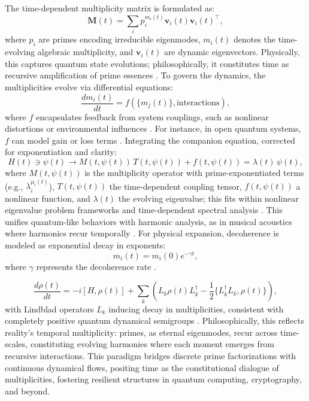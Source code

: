 \documentclass{article}
\theoremstyle{plain}
\begin{document}
The time-dependent multiplicity matrix is formulated as:
\begin{equation}
\mathbf{M}(t) = \sum_i p_i^{m_i(t)} \mathbf{v}_i(t) \mathbf{v}_i(t)^\top,
\end{equation}
where $p_i$ are primes encoding irreducible eigenmodes, $m_i(t)$ denotes the time-evolving algebraic multiplicity, and $\mathbf{v}_i(t)$ are dynamic eigenvectors. Physically, this captures quantum state evolutions; philosophically, it constitutes time as recursive amplification of prime essences \citep{ReedSimon1972,SakuraiNapolitano2017}. 
To govern the dynamics, the multiplicities evolve via differential equations:
\begin{equation}\frac{d m_i(t)}{dt} = f(\{m_j(t)\}, \text{interactions}),
\end{equation}
where $f$ encapsulates feedback from system couplings, such as nonlinear distortions or environmental influences \citep{Strogatz2015,Khalil2002}. For instance, in open quantum systems, $f$ can model gain or loss terms \citep{BreuerPetruccione2002}.
Integrating the companion equation, corrected for exponentiation and clarity:
\begin{equation}
H(t) \ni \psi(t) \to M(t, \psi(t))\, T(t, \psi(t)) + f(t, \psi(t)) = \lambda(t)\, \psi(t),
\end{equation}
where $M(t, \psi(t))$ is the multiplicity operator with prime-exponentiated terms (e.g., $\lambda_i^{\mu_i(t)}$), $T(t, \psi(t))$ the time-dependent coupling tensor, $f(t, \psi(t))$ a nonlinear function, and $\lambda(t)$ the evolving eigenvalue; this fits within nonlinear eigenvalue problem frameworks and time-dependent spectral analysis \citep{TisseurMeerbergen2001,ReedSimon1972}. This unifies quantum-like behaviors with harmonic analysis, as in musical acoustics where harmonics recur temporally \citep{FletcherRossing1998}.
For physical expansion, decoherence is modeled as exponential decay in exponents:
\begin{equation}
m_i(t) = m_i(0) e^{-\gamma t},
\end{equation}
where $\gamma$ represents the decoherence rate \citep{Zurek2003,BreuerPetruccione2002}.

\begin{equation}
\frac{d \rho(t)}{dt} = -i [H, \rho(t)] + \sum_k \left( L_k \rho(t) L_k^\dagger - \frac{1}{2} \{ L_k^\dagger L_k, \rho(t) \} \right),
\end{equation}
with Lindblad operators $L_k$ inducing decay in multiplicities, consistent with completely positive quantum dynamical semigroups \citep{Lindblad1976,GKS1976,BreuerPetruccione2002}.
Philosophically, this reflects reality's temporal multiplicity: primes, as eternal eigenmodes, recur across time-scales, constituting evolving harmonies where each moment emerges from recursive interactions. This paradigm bridges discrete prime factorizations with continuous dynamical flows, positing time as the constitutional dialogue of multiplicities, fostering resilient structures in quantum computing, cryptography, and beyond.
\end{document}
